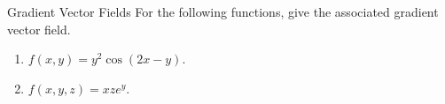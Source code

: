 \begin{exercise}{Gradient Vector Fields}
For the following functions, give the associated gradient vector field.
\vspace{1em}
\begin{enumerate}
\item $f(x,y)=y^2\cos(2x-y)$.
\vspace{1em}
\item $f(x,y,z)=xze^{y}$.
\end{enumerate}
\end{exercise}
